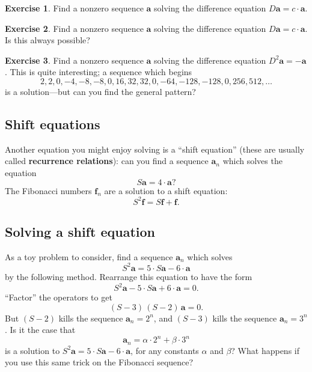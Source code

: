 \documentclass[12pt]{article}
\theoremstyle{definition}
\newtheorem{exercise}{Exercise}
\begin{document}
\begin{exercise}
  Find a nonzero sequence $\mathbf{a}$ solving the difference equation
  $D\mathbf{a} = c \cdot \mathbf{a}$.
\end{exercise}

\begin{exercise}
  Find a nonzero sequence $\mathbf{a}$ solving the difference equation
  $D\mathbf{a} = c \cdot \mathbf{a}$.  Is this always possible?
\end{exercise}

\begin{exercise}
  Find a nonzero sequence $\mathbf{a}$ solving the difference equation
  $D^2 \mathbf{a} = - \mathbf{a}$.  This is quite interesting; a sequence which begins
$$
2, 2, 0, -4,  -8, -8, 0, 16, 32, 32, 0, -64, -128, -128, 0, 256, 512, \ldots
$$
is a solution---but can you find the general pattern?
\end{exercise}

\subsection*{Shift equations}

Another equation you might enjoy solving is a ``shift equation''
(these are usually called \textbf{recurrence relations}): can you find
a sequence $\mathbf{a}_n$ which solves the equation
$$
S\mathbf{a} = 4 \cdot \mathbf{a}?
$$
The Fibonacci numbers $\mathbf{f}_n$ are a solution to a shift equation:
$$
S^2 \mathbf{f} = S \mathbf{f} + \mathbf{f}.
$$

\subsection*{Solving a shift equation}

As a toy problem to consider, find a sequence $\mathbf{a}_n$ which
solves
$$
S^2 \mathbf{a} = 5 \cdot S\mathbf{a} - 6 \cdot \mathbf{a}
$$
by the following method.  Rearrange this equation to have the form
$$
S^2 \mathbf{a} - 5 \cdot S\mathbf{a} + 6 \cdot \mathbf{a} = 0.
$$
``Factor'' the operators to get
$$
(S-3)\,(S-2)\,\mathbf{a} = 0.
$$
But $(S-2)$ kills the sequence $\mathbf{a}_n = 2^n$, and 
$(S-3)$ kills the sequence $\mathbf{a}_n = 3^n$.  Is it the case that
$$
\mathbf{a}_n = \alpha \cdot 2^n + \beta \cdot 3^n
$$
is a solution to $S^2 \mathbf{a} = 5 \cdot S\mathbf{a} - 6 \cdot
\mathbf{a}$, for any constants $\alpha$ and $\beta$?  What happens if
you use this same trick on the Fibonacci sequence?
\end{document}
